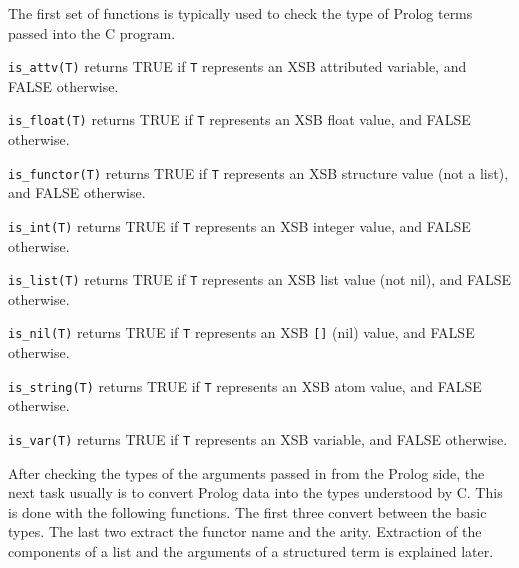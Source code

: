 The first set of functions is typically used to check the type of
Prolog terms passed into the C program. 
\begin{description}
 
    {\tt is\_attv(T)} returns TRUE if {\tt T} represents an XSB
    attributed variable,  and FALSE otherwise.

 
    {\tt is\_float(T)} returns TRUE if {\tt T} represents an XSB
    float value, and FALSE otherwise.

 
    {\tt is\_functor(T)} returns TRUE if {\tt T} represents an
    XSB structure value (not a list), and FALSE otherwise.

 
    {\tt is\_int(T)} returns TRUE if {\tt T} represents an XSB
    integer value, and FALSE otherwise.

 
    {\tt is\_list(T)} returns TRUE if {\tt T} represents an
    XSB list value (not nil), and FALSE otherwise.

 
    {\tt is\_nil(T)} returns TRUE if {\tt T} represents an XSB
    \verb|[]| (nil) value, and FALSE otherwise.

 
    {\tt is\_string(T)} returns TRUE if {\tt T} represents an XSB
    atom value, and FALSE otherwise.

 
    {\tt is\_var(T)} returns TRUE if {\tt T} represents an XSB
    variable, and FALSE otherwise.

\end{description}

After checking the types of the arguments passed in from the Prolog side,
the next task usually is to convert Prolog data into the types understood
by C.  This is done with the following functions. The first three convert
between the basic types. The last two extract the functor name and the
arity.  Extraction of the components of a list and the arguments of a
structured term is explained later.

